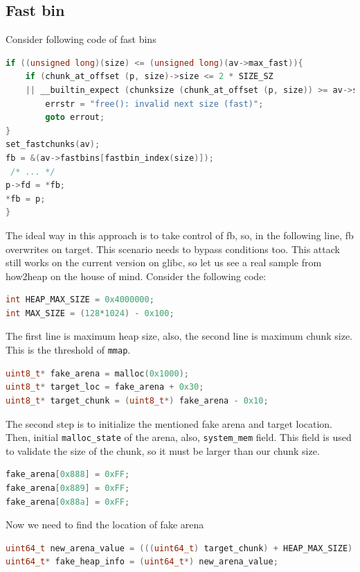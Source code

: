 \documentclass{masterthesis}
\newcommand*\libc{glibc}
\newcommand*\fb{fast bins}
\newcommand*\mmapc{\lstinline{mmap}\xspace}
\begin{document}
\subsection{Fast bin}
Consider following code of \fb{}
\begin{lstlisting}[language=c,frame=tlrb]
if ((unsigned long)(size) <= (unsigned long)(av->max_fast)){
	if (chunk_at_offset (p, size)->size <= 2 * SIZE_SZ
	|| __builtin_expect (chunksize (chunk_at_offset (p, size)) >= av->system_mem, 0)){
		errstr = "free(): invalid next size (fast)";
		goto errout;
}
set_fastchunks(av);
fb = &(av->fastbins[fastbin_index(size)]);
 /* ... */
p->fd = *fb;
*fb = p;
}

 \end{lstlisting}
The ideal way in this approach is to take control of fb, so, in the following line, fb overwrites on target. This scenario needs to bypass conditions too. This attack still works on the current version on \libc{}, so let us see a real sample from how2heap on the house of mind. Consider the following code:
\begin{lstlisting}[language=c,frame=tlrb]
int HEAP_MAX_SIZE = 0x4000000;
int MAX_SIZE = (128*1024) - 0x100;
\end{lstlisting}

The first line is maximum heap size, also, the second line is maximum chunk size. This is the threshold of \mmapc{}.
\begin{lstlisting}[language=c,frame=tlrb]
uint8_t* fake_arena = malloc(0x1000);
uint8_t* target_loc = fake_arena + 0x30;
uint8_t* target_chunk = (uint8_t*) fake_arena - 0x10;
\end{lstlisting}

The second step is to initialize the mentioned fake arena and target location. Then, initial \lstinline{malloc_state} of the arena, also, \lstinline{system_mem} field. This field is used to validate the size of the chunk, so it must be larger than our chunk size.
\begin{lstlisting}[language=c,frame=tlrb]
fake_arena[0x888] = 0xFF;
fake_arena[0x889] = 0xFF;
fake_arena[0x88a] = 0xFF;
\end{lstlisting}

Now we need to find the location of fake arena
\begin{lstlisting}[language=c,frame=tlrb]
uint64_t new_arena_value = (((uint64_t) target_chunk) + HEAP_MAX_SIZE) & ~(HEAP_MAX_SIZE - 1);
uint64_t* fake_heap_info = (uint64_t*) new_arena_value;
\end{lstlisting}
\end{document}
